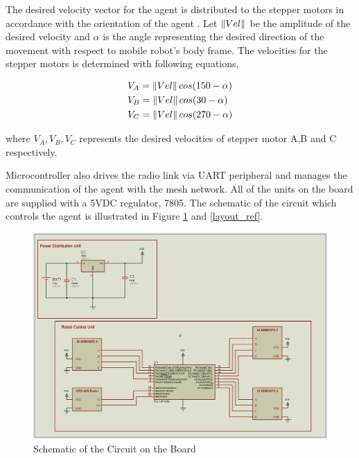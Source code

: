 The desired velocity vector for the agent is  distributed to the stepper motors in accordance with the orientation of the agent . Let $\left\lVert Vel\right\rVert$ be the amplitude of the desired velocity and $\alpha$ is the angle representing the desired direction of the movement with respect to mobile robot's body frame.  The velocities for the stepper motors is determined with following equations,
		
\begin{align*}
& V_A = \left\lVert Vel\right\rVert cos(150-\alpha) \\
& V_B = \left\lVert Vel\right\rVert cos(30 -\alpha) \\
& V_C = \left\lVert Vel\right\rVert cos(270-\alpha) 
\end{align*}  

where $V_A, V_B, V_C$ represents the desired velocities of  stepper motor A,B and C respectively.
		
Microcontroller also drives the radio link via UART peripheral and manages the communication of the agent with the mesh network. All of the units on the board are supplied with a 5VDC regulator, 7805. The schematic of the circuit which controls the agent is illustrated in Figure \ref{sematik_ref} and \ref{layout_ref}.
		
\begin{figure}[H]
\caption{Schematic of the Circuit on the Board} \label{sematik_ref}
\centerline{\includegraphics[scale = 0.40]{sematik}}
\end{figure} 

